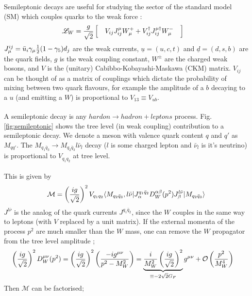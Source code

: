 Semileptonic decays are useful for studying the sector of the standard model (SM) which couples quarks to the weak force \cite{Richman:1995wm}:
\begin{align}
 \mathscr{L}_{W} & = {g\over\sqrt{2}} \left[ \quad V_{ij} J_{ij}^{\mu} W_{\mu}^+ + V^{\dagger}_{ij} J_{ij}^{\mu \dagger} W_{\mu}^- \quad \right]
  \label{eq:weakL}
\end{align}
$J_{\mu}^{ij} = \bar{u}_i \gamma_{\mu} {1\over2}(1-\gamma_5) d_j$ are the weak currents,
$\underline{u} = ( u, c, t )$ and $\underline{d} = ( d, s, b )$ are the quark fields, $g$ is the weak coupling constant, $W^{\pm}$ are the charged weak bosons, and $V$ is the (unitary)
Cabibbo-Kobayashi-Maskawa (CKM) matrix. $V_{ij}$ can be thought of as a matrix of couplings which dictate the probability
of mixing between two quark flavours, for example the amplitude of a $b$ decaying to a $u$ (and emitting a $W$) is proportional to $V_{13} \equiv V_{ub}$.
\\ \\
A semileptonic decay is any $hardon\to hadron+leptons$ process. Fig. \ref{fig:semileptonic} shows the tree level (in weak coupling) contribution to a semileptonic decay. We denote a meson with valence quark content $q$ and $q'$ as $M_{qq'}$. The $M_{q_1\bar{q}_3} \to M_{q_2\bar{q}_3} l \bar{\nu}_l$ decay ($l$ is some charged lepton and $\bar{\nu}_l$ is it's neutrino) is proportional to $V_{q_1q_2}$ at tree level.
\\ \\
This is given by
\begin{align}
  \mathcal{M} = \left({ig\over\sqrt{2}}\right)^2 V_{q_1q_2} \langle M_{q_2\bar{q}_3}, l\bar{\nu} | J_{\alpha}^{q_1\bar{q}_2} D^{\alpha\beta}_W(p^2) J^{l\bar{\nu}}_{\beta} | M_{q_2\bar{q}_3} \rangle
\end{align}
$J^{l\bar{\nu}}$ is the analog of the quark currents $J^{q_1\bar{q}_2}$, since the $W$ couples in the same way to leptons (with $V$ replaced by a unit matrix).
If the external momenta of the process $p^2$ are much smaller than the $W$ mass, one can remove the $W$ propagator from the tree level amplitude \cite{Borasoy:2007yi};
\begin{align}
 \left({ig\over\sqrt{2}}\right)^2 D^{\mu\nu}_W(p^2) = \left({ig\over\sqrt{2}}\right)^2 \left( -ig^{\mu\nu} \over p^2 - M_W^2 \right)
  & = \underbrace{ {i\over M_W^2} \left( ig \over \sqrt{2} \right)^2  }_{\equiv -2\sqrt{2}G_F} g^{\mu\nu} + \mathcal{O}\left({p^2\over M_W^4}\right)
\end{align}
Then $\mathcal{M}$ can be factorised;

